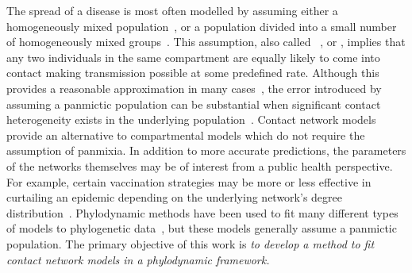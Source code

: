 
The spread of a disease is most often modelled by assuming either a
homogeneously mixed population~\autocite{hamer1906milroy,
kermack1927contribution}, or a population divided into a small number of
homogeneously mixed groups~\autocite{rushton1955deterministic}. This
assumption, also called ~\autocite{heesterbeek2000mathematical}, or , implies
that any two individuals in the same compartment are equally likely to come
into contact making transmission possible at some predefined rate. Although
this provides a reasonable approximation in many
cases~\autocite{anderson1992infectious}, the error introduced by assuming a
panmictic population can be substantial when significant contact heterogeneity
exists in the underlying
population~\autocite{bansal2007individual,barthelemy2005dynamical,keeling2005networks}.
Contact network models provide an alternative to compartmental models which do
not require the assumption of panmixia. In addition to more accurate
predictions, the parameters of the networks themselves may be of interest from
a public health perspective. For example, certain vaccination strategies may be
more or less effective in curtailing an epidemic depending on the underlying
network's degree distribution~\autocite{peng2013vaccination, ma2013importance}.
Phylodynamic methods have been used to fit many different types of models to
phylogenetic data~\autocite{pybus2009evolutionary,volz2013viral}, but these
models generally assume a panmictic population. The primary objective of this
work is \emph{to develop a method to fit contact network models in a
phylodynamic framework.}

\newcommand{\G}{\mathcal{G}}
\newcommand{\Nu}{\mathcal{N}}

